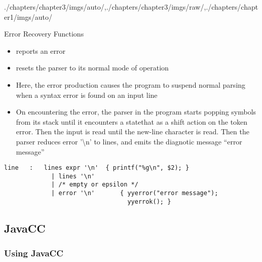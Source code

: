 \begin{graphicspathcontext}{{./chapters/chapter3/imgs/auto/},{./chapters/chapter3/imgs/raw/},{./chapters/chapter1/imgs/auto/}}
\begin{bibunit}[apalike]
\begin{frame}[fragile]{Error Recovery Functions}
	\begin{itemize}
	\item {} reports an error
	\item {} resets the parser to its normal mode of operation
	\vfill
	\item \small Here, the error production causes the program to suspend normal parsing when a syntax error is found on an input line
	\item \small On encountering the error, the parser in the program starts popping symbols from its stack until it encounters a statethat as a shift action on the token error. Then the input is read until the new-line character is read. Then the parser reduces error '{\textbackslash}n' to lines, and emits the diagnotic message ``error message''
	\end{itemize}
	\begin{lstlisting}[style=lststyle-c]
	line   :   lines expr '\n'  { printf("%g\n", $2); }
	         | lines '\n'
	         | /* empty or epsilon */
	         | error '\n'       { yyerror("error message");
                                  yyerrok(); }
	\end{lstlisting}
\end{frame}

\subsection{JavaCC}
\subsectiontableofcontentslide*

\subsubsection{Using JavaCC}



\end{bibunit}
\end{graphicspathcontext}
